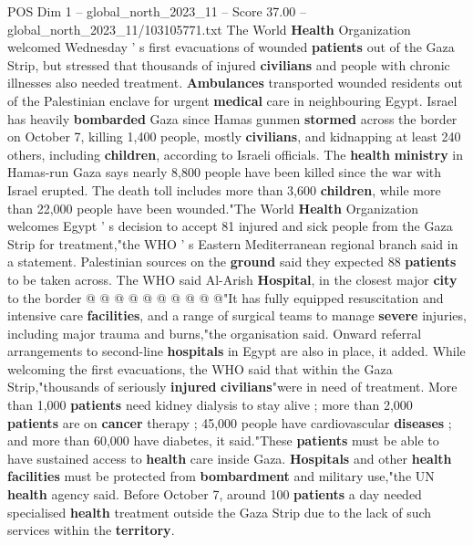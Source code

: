 \begin{textsample}{POS Dim 1 – global\_north\_2023\_11 – Score 37.00 – global\_north\_2023\_11/103105771.txt}  \label{ex:f1_pos_260}
The World \textbf{Health} Organization welcomed Wednesday ' s first evacuations of wounded \textbf{patients} out of the Gaza Strip, but stressed that thousands of injured \textbf{civilians} and people with chronic illnesses also needed treatment. \textbf{Ambulances} transported wounded residents out of the Palestinian enclave for urgent \textbf{medical} care in neighbouring Egypt.
Israel has heavily \textbf{bombarded} Gaza since Hamas gunmen \textbf{stormed} across the border on October 7, killing 1,400 people, mostly \textbf{civilians}, and kidnapping at least 240 others, including \textbf{children}, according to Israeli officials.
The \textbf{health} \textbf{ministry} in Hamas-run Gaza says nearly 8,800 people have been killed since the war with Israel erupted.
The death toll includes more than 3,600 \textbf{children}, while more than 22,000 people have been wounded."The World \textbf{Health} Organization welcomes Egypt ' s decision to accept 81 injured and sick people from the Gaza Strip for treatment,"the WHO ' s Eastern Mediterranean regional branch said in a statement.
Palestinian sources on the \textbf{ground} said they expected 88 \textbf{patients} to be taken across.
The WHO said Al-Arish \textbf{Hospital}, in the closest major \textbf{city} to the border @ @ @ @ @ @ @ @ @ @"It has fully equipped resuscitation and intensive care \textbf{facilities}, and a range of surgical teams to manage \textbf{severe} injuries, including major trauma and burns,"the organisation said.
Onward referral arrangements to second-line \textbf{hospitals} in Egypt are also in place, it added.
While welcoming the first evacuations, the WHO said that within the Gaza Strip,"thousands of seriously \textbf{injured} \textbf{civilians}"were in need of treatment.
More than 1,000 \textbf{patients} need kidney dialysis to stay alive ; more than 2,000 \textbf{patients} are on \textbf{cancer} therapy ; 45,000 people have cardiovascular \textbf{diseases} ; and more than 60,000 have diabetes, it said."These \textbf{patients} must be able to have sustained access to \textbf{health} care inside Gaza. \textbf{Hospitals} and other \textbf{health} \textbf{facilities} must be protected from \textbf{bombardment} and military use,"the UN \textbf{health} agency said.
Before October 7, around 100 \textbf{patients} a day needed specialised \textbf{health} treatment outside the Gaza Strip due to the lack of such services within the \textbf{territory}.

\end{textsample}

